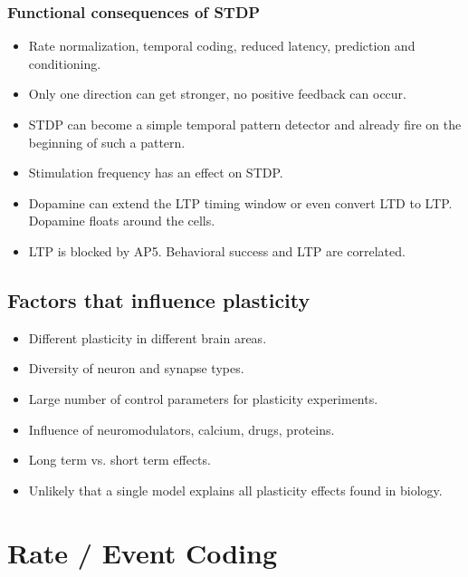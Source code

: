 \documentclass[a4paper, 12pt]{article}
\begin{document}
\subsubsection{Functional consequences of STDP}
\begin{itemize}[noitemsep,nolistsep]
	\item Rate normalization, temporal coding, reduced latency, prediction and conditioning.
	\item Only one direction can get stronger, no positive feedback can occur.
	\item STDP can become a simple temporal pattern detector and already fire on the beginning of such a pattern.
	\item Stimulation frequency has an effect on STDP.
	\item Dopamine can extend the LTP timing window or even convert LTD to LTP. Dopamine floats around the cells.
	\item LTP is blocked by AP5. Behavioral success and LTP are correlated.
\end{itemize}

\subsection{Factors that influence plasticity}
\begin{itemize}[noitemsep,nolistsep]
	\item Different plasticity in different brain areas.
	\item Diversity of neuron and synapse types.
	\item Large number of control parameters for plasticity experiments.
	\item Influence of neuromodulators, calcium, drugs, proteins.
	\item Long term vs. short term effects.
	\item Unlikely that a single model explains all plasticity effects found in biology.
\end{itemize}

\section{Rate / Event Coding}
\end{document}
